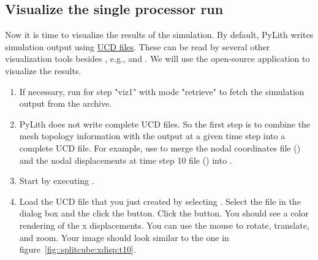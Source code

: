 \subsection{Visualize the single processor run}

Now it is time to visualize the results of the simulation. By default,
PyLith writes simulation output using \href{http://help.avs.com/Express/doc/help/reference/dvmac/UCD\_Form.htm}{ UCD
  files}.
These can be read by several other visualization tools besides
, e.g.,  and . We will use the open-source application
 to visualize the results.
    
\begin{enumerate}
\item If necessary, run  for step "viz1" with mode
  "retrieve" to fetch the simulation output from the archive.

  \begin{screen}
    \shellprompt{}
  \end{screen}
  
\item PyLith does not write complete UCD files. So the first step is
  to combine the mesh topology information with the output at a given
  time step into a complete UCD file. For example, use 
  to merge the nodal coordinates file
  () and the nodal displacements at
  time step 10 file () into
  .

  \begin{screen}
    \shellprompt{}
\end{screen}

\item Start  by executing .

  \begin{screen}
    \shellprompt{}
  \end{screen}
  
\item Load the UCD file that you just created by selecting
  \guiselect{}. Select the file in
  the dialog box and the click the  button. Click the
   button. You should see a color rendering of the x
  displacements. You can use the mouse to rotate, translate, and zoom.
  Your image should look similar to the one in
  figure~\ref{fig::splitcube:xdisp:t10}.
        

\end{enumerate}

